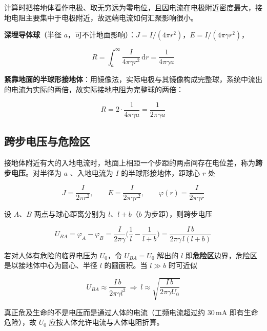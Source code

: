 计算时把接地体看作电极、取无穷远为零电位，且因电流在电极附近密度最大，接地电阻主要集中于电极附近，故远端电流如何汇聚影响很小。

\textbf{深埋导体球}（半径 $a$，可不计地面影响）：$J=I/(4\pi r^2)$，$E=I/(4\pi\gamma r^2)$，
\begin{formulaBox}
\[
R=\int_a^\infty \frac{I}{4\pi\gamma r^2}\,\mathrm{d}r=\frac{1}{4\pi\gamma a}
\]
\end{formulaBox}
\textbf{紧靠地面的半球形接地体}：用镜像法，实际电极与其镜像构成完整球，系统中流出的电流为实际的两倍，故实际接地电阻为完整球的两倍：
\begin{formulaBox}
\[
R=2\cdot\frac{1}{4\pi\gamma a}=\frac{1}{2\pi\gamma a}
\]
\end{formulaBox}

\subsection{跨步电压与危险区}
接地体附近有大的入地电流时，地面上相距一个步距的两点间存在电位差，称为\textbf{跨步电压}。对半径为 $a$ 、入地电流为 $I$ 的半球形接地体，距球心 $r$ 处
\begin{formulaBox}
\[
J=\frac{I}{2\pi r^2},\qquad E=\frac{I}{2\pi\gamma r^2},\qquad
\varphi(r)=\frac{I}{2\pi\gamma r}
\]
\end{formulaBox}
设 $A$、$B$ 两点与球心距离分别为 $l$、$l+b$（$b$ 为步距），则跨步电压
\begin{formulaBox}
\[
U_{BA}=\varphi_A-\varphi_B=\frac{I}{2\pi\gamma}\Big(\frac{1}{l}-\frac{1}{l+b}\Big)
=\frac{I\,b}{2\pi\gamma\,l(l+b)}
\]
\end{formulaBox}
若对人体有危险的临界电压为 $U_0$，令 $U_{BA}=U_0$ 解出的 $l$ 即\textbf{危险区}边界，危险区是以接地体中心为圆心、半径 $l$ 的圆面积。当 $l\gg b$ 时可近似
\begin{formulaBox}
\[
U_{BA}\approx\frac{I\,b}{2\pi\gamma l^2}
\ \Longrightarrow\
l\approx\sqrt{\frac{I\,b}{2\pi\gamma U_0}}
\]
\end{formulaBox}
真正危及生命的不是电压而是通过人体的电流（工频电流超过约 30\,mA 即有生命危险），故 $U_0$ 应按人体允许电流与人体电阻折算。

